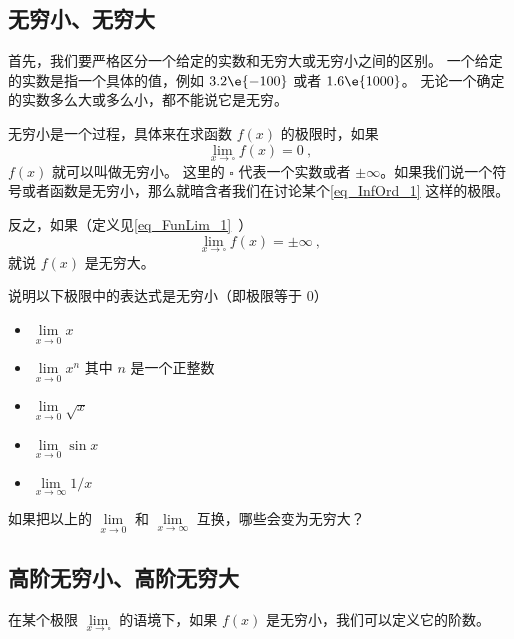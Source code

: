 

\subsection{无穷小、无穷大}
首先，我们要严格区分一个给定的实数和无穷大或无穷小之间的区别。 一个给定的实数是指一个具体的值，例如 $3.2\e{-100}$ 或者 $1.6\e{1000}$。 无论一个确定的实数多么大或多么小，都不能说它是无穷。

无穷小是一个过程，具体来在求函数 $f(x)$ 的极限时，如果
\begin{equation}\label{eq_InfOrd_1}
\lim_{x\to \square} f(x) = 0~,
\end{equation}
$f(x)$ 就可以叫做无穷小。 这里的 $\square$ 代表一个实数或者 $\pm\infty$。如果我们说一个符号或者函数是无穷小，那么就暗含者我们在讨论某个\autoref{eq_InfOrd_1} 这样的极限。

反之，如果（定义见\autoref{eq_FunLim_1}~）
\begin{equation}
\lim_{x\to \square} f(x) = \pm\infty~,
\end{equation}
就说 $f(x)$ 是无穷大。

\begin{exercise}{}
说明以下极限中的表达式是无穷小（即极限等于 0）
\begin{itemize}
\item $\lim\limits_{x\to 0} x$
\item $\lim\limits_{x\to 0} x^n$ 其中 $n$ 是一个正整数
\item $\lim\limits_{x\to 0} \sqrt{x}$
\item $\lim\limits_{x\to 0} \sin x$
\item $\lim\limits_{x\to \infty} 1/x$
\end{itemize}
如果把以上的 $\lim\limits_{x\to 0}$ 和 $\lim\limits_{x\to \infty}$ 互换，哪些会变为无穷大？
\end{exercise}

\subsection{高阶无穷小、高阶无穷大}
在某个极限 $\lim\limits_{x\to \square}$ 的语境下，如果 $f(x)$ 是无穷小，我们可以定义它的阶数。

